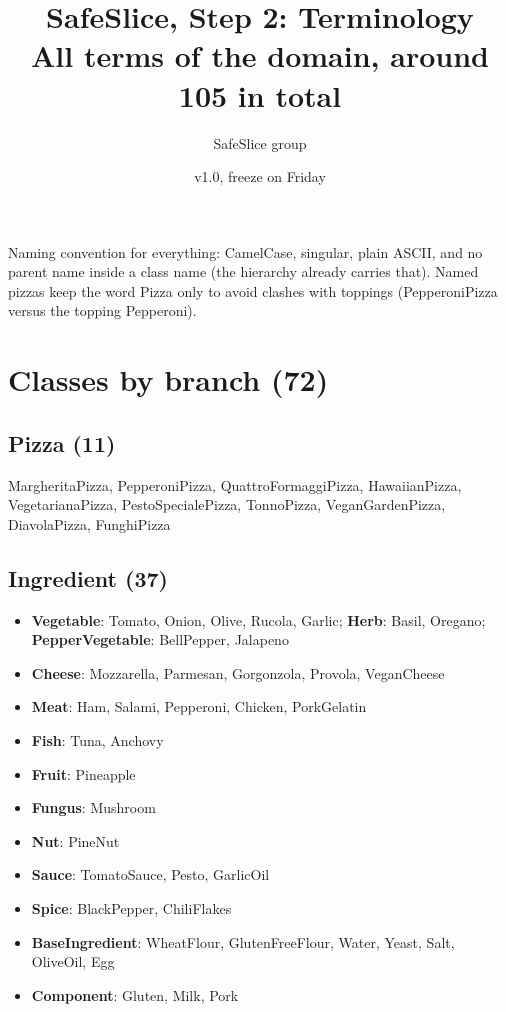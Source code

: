 \documentclass[11pt,a4paper]{article}
\title{SafeSlice, Step 2: Terminology\\ \large All terms of the domain, around 105 in total}
\author{SafeSlice group}
\date{v1.0, freeze on Friday}
\begin{document}
\maketitle

\noindent Naming convention for everything: CamelCase, singular, plain ASCII, and no parent name inside a class name (the hierarchy already carries that). Named pizzas keep the word Pizza only to avoid clashes with toppings (PepperoniPizza versus the topping Pepperoni).

\section{Classes by branch (72)}

\subsection*{Pizza (11)}
MargheritaPizza, PepperoniPizza, QuattroFormaggiPizza, HawaiianPizza, VegetarianaPizza, PestoSpecialePizza, TonnoPizza, VeganGardenPizza, DiavolaPizza, FunghiPizza

\subsection*{Ingredient (37)}
\begin{itemize}[leftmargin=*, itemsep=1pt]
\item \textbf{Vegetable}: Tomato, Onion, Olive, Rucola, Garlic; \textbf{Herb}: Basil, Oregano; \textbf{PepperVegetable}: BellPepper, Jalapeno
\item \textbf{Cheese}: Mozzarella, Parmesan, Gorgonzola, Provola, VeganCheese
\item \textbf{Meat}: Ham, Salami, Pepperoni, Chicken, PorkGelatin
\item \textbf{Fish}: Tuna, Anchovy
\item \textbf{Fruit}: Pineapple
\item \textbf{Fungus}: Mushroom
\item \textbf{Nut}: PineNut
\item \textbf{Sauce}: TomatoSauce, Pesto, GarlicOil
\item \textbf{Spice}: BlackPepper, ChiliFlakes
\item \textbf{BaseIngredient}: WheatFlour, GlutenFreeFlour, Water, Yeast, Salt, OliveOil, Egg
\item \textbf{Component}: Gluten, Milk, Pork
\end{itemize}
\end{document}
